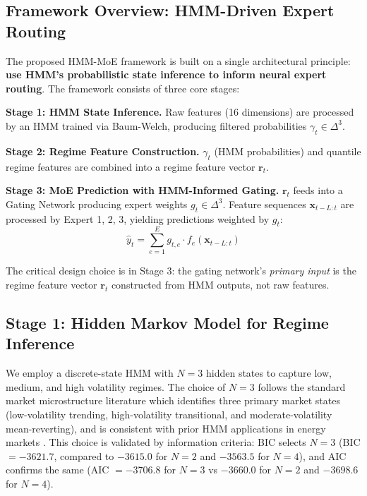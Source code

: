 \documentclass[3p,times]{elsarticle}
\begin{document}
\subsection{Framework Overview: HMM-Driven Expert Routing}

The proposed HMM-MoE framework is built on a single architectural principle: \textbf{use HMM's probabilistic state inference to inform neural expert routing}. The framework consists of three core stages:

\textbf{Stage 1: HMM State Inference.} Raw features (16 dimensions) are processed by an HMM trained via Baum-Welch, producing filtered probabilities $\gamma_t \in \Delta^3$.

\textbf{Stage 2: Regime Feature Construction.} $\gamma_t$ (HMM probabilities) and quantile regime features are combined into a regime feature vector $\mathbf{r}_t$.

\textbf{Stage 3: MoE Prediction with HMM-Informed Gating.} $\mathbf{r}_t$ feeds into a Gating Network producing expert weights $g_t \in \Delta^3$. Feature sequences $\mathbf{x}_{t-L:t}$ are processed by Expert 1, 2, 3, yielding predictions weighted by $g_t$:
\begin{equation}
\hat{y}_t = \sum_{e=1}^{E} g_{t,e} \cdot f_e(\mathbf{x}_{t-L:t})
\end{equation}

The critical design choice is in Stage 3: the gating network's \textit{primary input} is the regime feature vector $\mathbf{r}_t$ constructed from HMM outputs, not raw features.

\subsection{Stage 1: Hidden Markov Model for Regime Inference}
\label{sec:method:hmm}

We employ a discrete-state HMM with $N=3$ hidden states to capture low, medium, and high volatility regimes. The choice of $N=3$ follows the standard market microstructure literature which identifies three primary market states (low-volatility trending, high-volatility transitional, and moderate-volatility mean-reverting), and is consistent with prior HMM applications in energy markets \cite{sims2006,iwaniec2019}. This choice is validated by information criteria: BIC selects $N=3$ (BIC $= -3621.7$, compared to $-3615.0$ for $N=2$ and $-3563.5$ for $N=4$), and AIC confirms the same (AIC $= -3706.8$ for $N=3$ vs $-3660.0$ for $N=2$ and $-3698.6$ for $N=4$).
\end{document}
